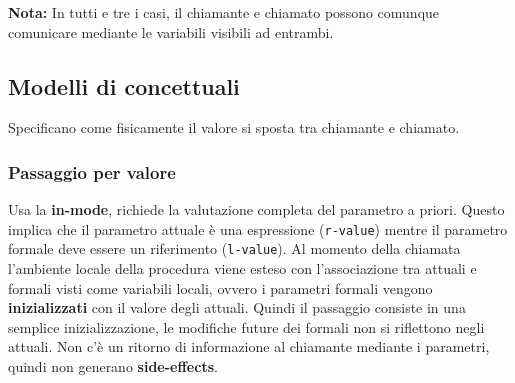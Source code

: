 \documentclass[12pt,a4paper]{article}
\begin{document}
\textbf{Nota:} In tutti e tre i casi, il chiamante e chiamato possono comunque comunicare mediante le variabili visibili ad entrambi.

\begin{figure}[h!]
	\begin{center}
	\end{center}
\end{figure}

\clearpage

\subsection{Modelli di concettuali}
Specificano come fisicamente il valore si sposta tra chiamante e chiamato.

\subsubsection{Passaggio per valore}
Usa la \textbf{in-mode}, richiede la valutazione completa del parametro a priori. Questo implica che il parametro attuale è una espressione (\texttt{r-value}) mentre il parametro formale deve essere un riferimento (\texttt{l-value}). Al momento della chiamata l'ambiente locale della procedura viene esteso con l'associazione tra attuali e formali visti come variabili locali, ovvero i parametri formali vengono \textbf{inizializzati} con il valore degli attuali. Quindi il passaggio consiste in una semplice inizializzazione, le modifiche future dei formali non si riflettono negli attuali. Non c'è un ritorno di informazione al chiamante mediante i parametri, quindi non generano \textbf{side-effects}.
\end{document}
